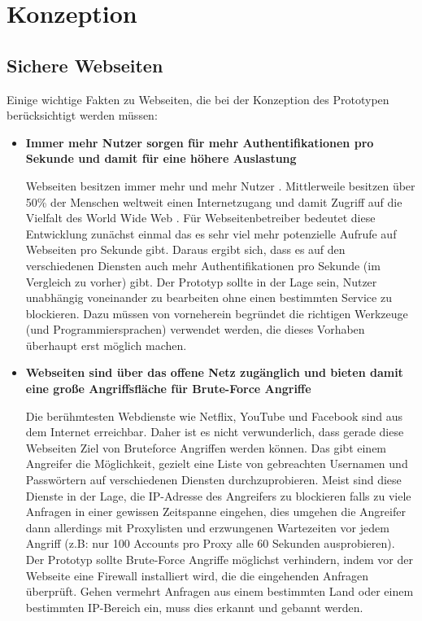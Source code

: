 \chapter{Konzeption}
\section{Sichere Webseiten}
Einige wichtige Fakten zu Webseiten, die bei der Konzeption des Prototypen berücksichtigt werden müssen:

\begin{itemize}
\item \textbf{Immer mehr Nutzer sorgen für mehr Authentifikationen pro Sekunde und damit für eine höhere Auslastung}

Webseiten besitzen immer mehr und mehr Nutzer \cite{A31}. Mittlerweile besitzen über 50\% der Menschen weltweit einen Internetzugang und damit Zugriff auf die Vielfalt des World Wide Web \cite{A30}. Für Webseitenbetreiber bedeutet diese Entwicklung zunächst einmal das es sehr viel mehr potenzielle Aufrufe auf Webseiten pro Sekunde gibt. Daraus ergibt sich, dass es auf den verschiedenen Diensten auch mehr Authentifikationen pro Sekunde (im Vergleich zu vorher) gibt. Der Prototyp sollte in der Lage sein, Nutzer unabhängig voneinander zu bearbeiten ohne einen bestimmten Service zu blockieren. Dazu müssen von vorneherein begründet die richtigen Werkzeuge (und Programmiersprachen) verwendet werden, die dieses Vorhaben überhaupt erst möglich machen.

\item \textbf{Webseiten sind über das offene Netz zugänglich und bieten damit eine große Angriffsfläche für Brute-Force Angriffe}

Die berühmtesten Webdienste wie Netflix, YouTube und Facebook sind aus dem Internet erreichbar. Daher ist es nicht verwunderlich, dass gerade diese Webseiten Ziel von Bruteforce Angriffen werden können. Das gibt einem Angreifer die Möglichkeit, gezielt eine Liste von gebreachten Usernamen und Passwörtern auf verschiedenen Diensten durchzuprobieren. Meist sind diese Dienste in der Lage, die IP-Adresse des Angreifers zu blockieren falls zu viele Anfragen in einer gewissen Zeitspanne eingehen, dies umgehen die Angreifer dann allerdings mit Proxylisten und erzwungenen Wartezeiten vor jedem Angriff (z.B: nur 100 Accounts pro Proxy alle 60 Sekunden ausprobieren). Der Prototyp sollte Brute-Force Angriffe möglichst verhindern, indem vor der Webseite eine Firewall installiert wird, die die eingehenden Anfragen überprüft. Gehen vermehrt Anfragen aus einem bestimmten Land oder einem bestimmten IP-Bereich ein, muss dies erkannt und gebannt werden.


\end{itemize}
